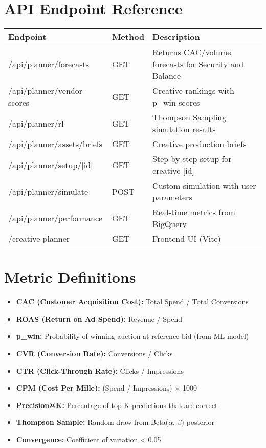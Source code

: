 \documentclass[11pt,a4paper]{report}
\begin{document}
\section{API Endpoint Reference}

\begin{longtable}{|l|l|p{7cm}|}
\hline
\rowcolor{aelpblue!20}
\textbf{Endpoint} & \textbf{Method} & \textbf{Description} \\
\hline
\endhead

/api/planner/forecasts & GET & Returns CAC/volume forecasts for Security and Balance \\
\hline
/api/planner/vendor-scores & GET & Creative rankings with p\_win scores \\
\hline
/api/planner/rl & GET & Thompson Sampling simulation results \\
\hline
/api/planner/assets/briefs & GET & Creative production briefs \\
\hline
/api/planner/setup/[id] & GET & Step-by-step setup for creative [id] \\
\hline
/api/planner/simulate & POST & Custom simulation with user parameters \\
\hline
/api/planner/performance & GET & Real-time metrics from BigQuery \\
\hline
/creative-planner & GET & Frontend UI (Vite) \\
\hline
\end{longtable}

\section{Metric Definitions}

\begin{itemize}
    \item \textbf{CAC (Customer Acquisition Cost):} Total Spend / Total Conversions
    \item \textbf{ROAS (Return on Ad Spend):} Revenue / Spend
    \item \textbf{p\_win:} Probability of winning auction at reference bid (from ML model)
    \item \textbf{CVR (Conversion Rate):} Conversions / Clicks
    \item \textbf{CTR (Click-Through Rate):} Clicks / Impressions
    \item \textbf{CPM (Cost Per Mille):} (Spend / Impressions) × 1000
    \item \textbf{Precision@K:} Percentage of top K predictions that are correct
    \item \textbf{Thompson Sample:} Random draw from Beta($\alpha$, $\beta$) posterior
    \item \textbf{Convergence:} Coefficient of variation < 0.05
\end{itemize}
\end{document}
